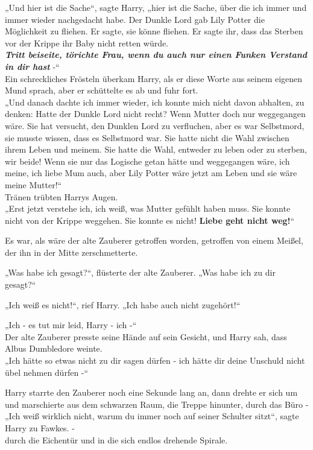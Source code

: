 {„Und hier ist die Sache“, sagte Harry, „hier ist die Sache, über die ich immer und immer wieder nachgedacht habe. Der Dunkle Lord gab Lily Potter die Möglichkeit zu fliehen. Er sagte, sie könne fliehen. Er sagte ihr, dass das Sterben vor der Krippe ihr Baby nicht retten würde.\\ \textbf{\emph{Tritt beiseite, törichte Frau, wenn du auch nur einen Funken Verstand in dir hast}} -“\\ Ein schreckliches Frösteln überkam Harry, als er diese Worte aus seinem eigenen Mund sprach, aber er schüttelte es ab und fuhr fort.\\ „Und danach dachte ich immer wieder, ich konnte mich nicht davon abhalten, zu denken: Hatte der Dunkle Lord nicht recht? Wenn Mutter doch nur weggegangen wäre. Sie hat versucht, den Dunklen Lord zu verfluchen, aber es war Selbstmord, sie musste wissen, dass es Selbstmord war. Sie hatte nicht die Wahl zwischen ihrem Leben und meinem. Sie hatte die Wahl, entweder zu leben oder zu sterben, wir beide! Wenn sie nur das Logische getan hätte und weggegangen wäre, ich meine, ich liebe Mum auch, aber Lily Potter wäre jetzt am Leben und sie wäre meine Mutter!“\\ Tränen trübten Harrys Augen.\\ „Erst jetzt verstehe ich, ich weiß, was Mutter gefühlt haben muss. Sie konnte nicht von der Krippe weggehen. Sie konnte es nicht! \textbf{Liebe geht nicht weg!}“

Es war, als wäre der alte Zauberer getroffen worden, getroffen von einem Meißel, der ihn in der Mitte zerschmetterte.

„Was habe ich gesagt?“, flüsterte der alte Zauberer. „Was habe ich zu dir gesagt?“

„Ich weiß es nicht!“, rief Harry. „Ich habe auch nicht zugehört!“

„Ich - es tut mir leid, Harry - ich -“\\ Der alte Zauberer presste seine Hände auf sein Gesicht, und Harry sah, dass Albus Dumbledore weinte.\\ „Ich hätte so etwas nicht zu dir sagen dürfen - ich hätte dir deine Unschuld nicht übel nehmen dürfen -“

Harry starrte den Zauberer noch eine Sekunde lang an, dann drehte er sich um und marschierte aus dem schwarzen Raum, die Treppe hinunter, durch das Büro -\\ „Ich weiß wirklich nicht, warum du immer noch auf seiner Schulter sitzt“, sagte Harry zu Fawkes. -\\ durch die Eichentür und in die sich endlos drehende Spirale.

}
